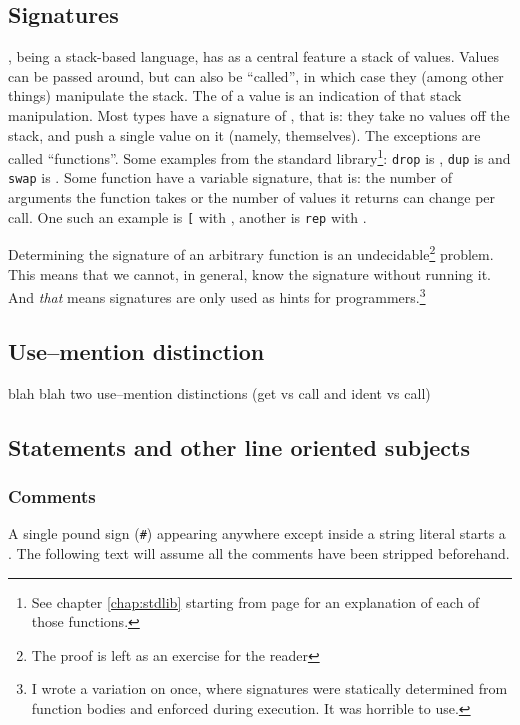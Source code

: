 \subsection{Signatures}
\dv{}, being a stack-based language, has as a central feature a stack of
values. Values can be passed around, but can also be ``called'', in which case
they (among other things) manipulate the stack. The  of a
value is an indication of that stack manipulation. Most types have a signature
of , that is: they take no values off the stack, and push a single
value on it (namely, themselves). The exceptions are called ``functions''.
Some examples from the standard library\footnote{See chapter \ref{chap:stdlib} starting from page \pageref{chap:stdlib} for an explanation of
each of those functions.}: \verb!drop! is , \verb!dup!
is  and \verb!swap! is . Some function have a variable
signature, that is: the number of arguments the function takes or the number of
values it returns can change per call. One such an example is \verb![! with
, another is \verb!rep! with .

Determining the signature of an arbitrary function is an undecidable\footnote{The
proof is left as an exercise for the reader} problem. This means that we
cannot, in general, know the signature without running it. And \emph{that}
means signatures are only used as hints for programmers.\footnote{I wrote a
variation on \dv{} once, where signatures were statically determined from
function bodies and enforced during execution. It was horrible to use.}

\subsection{Use--mention distinction}
blah blah two use--mention distinctions (get vs call and ident vs call)

\subsection{Statements and other line oriented subjects}
\subsubsection{Comments}

A single pound sign (\verb!#!) appearing anywhere except inside a string
literal starts a . The following text will assume all the
comments have been stripped beforehand.

